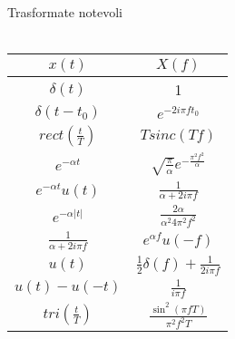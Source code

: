 \documentclass{article}
\begin{document}
\newpage\huge
\begin{center}
    Trasformate notevoli\\\scriptsize\hspace*{1cm}\\\huge
    {\renewcommand{\arraystretch}{2}
        \begin{tabular}{|c|c|}
            \hline
            \(x(t)\)&\(X(f)\)\\
            \hline
            \(\delta(t)\)&1\\
            \hline
            \(\delta(t-t_0)\)&\(e^{-2i\pi f t_0}\)\\
            \hline
            \(rect\left(\frac{t}{T}\right)\)&\(Tsinc(Tf)\)\\
            \hline
            \(e^{-\alpha t}\)&\(\sqrt{\frac{\pi}{\alpha}}e^{-\frac{\pi^2 f^2}{\alpha}}\)\\
            \hline
            \(e^{-\alpha t}u(t)\)&\(\frac{1}{\alpha+2i\pi f}\)\\
            \hline
           \(e^{-\alpha|t|}\)&\(\frac{2\alpha}{\alpha^2 4\pi^2 f^2}\)\\
            \hline
            \(\frac{1}{\alpha+2i\pi f}\)&\(e^{\alpha f}u(-f)\)\\
           \hline
            \(u(t)\)&\(\frac{1}{2}\delta(f)+\frac{1}{2i\pi f}\)\\
            \hline
            \(u(t)-u(-t)\)&\(\frac{1}{i\pi f}\)\\
            \hline
            \(tri\left(\frac{t}{T}\right)\)&\(\frac{\sin^2(\pi fT)}{\pi^2 f^2 T}\)\\
            \hline
        \end{tabular}
    }
\end{center}
\end{document}

